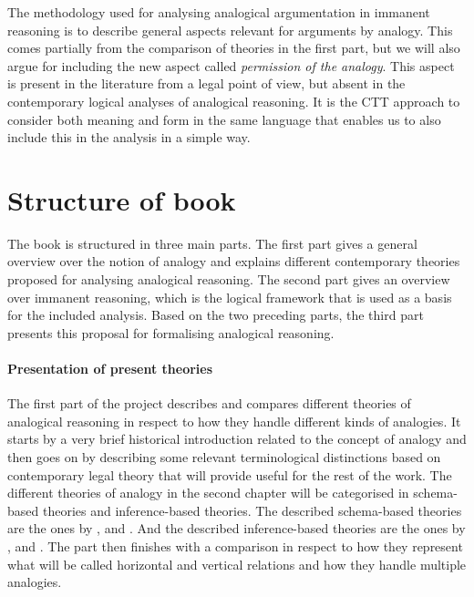     		The methodology used for analysing analogical argumentation in immanent reasoning is to describe general aspects relevant for arguments by analogy. This comes partially from the comparison of theories in the first part, but we will also argue for including the new aspect called \textit{permission of the analogy}. This aspect is present in the literature from a legal point of view, but absent in the contemporary logical analyses of analogical reasoning. It is the CTT approach to consider both meaning and form in the same language that enables us to also include this in the analysis in a simple way. 
    
    \section{Structure of book}
    
        The book is structured in three main parts. The first part gives a general overview over the notion of analogy and explains different contemporary theories proposed for analysing analogical reasoning. The second part gives an overview over immanent reasoning, which is the logical framework that is used as a basis for the included analysis. Based on the two preceding parts, the third part presents this proposal for formalising analogical reasoning. 
        
        \paragraph{Presentation of present theories}
        
            The first part of the project describes and compares different theories of analogical reasoning in respect to how they handle different kinds of analogies. It starts by a very brief historical introduction related to the concept of analogy and then goes on by describing some relevant terminological distinctions based on contemporary legal theory that will provide useful for the rest of the work. The different theories of analogy in the second chapter will be categorised in schema-based theories and inference-based theories. The described schema-based theories are the ones by \textcite{Brewer1996}, \textcite{alchourron1991argumentos} and \textcite{woods2015legal}. And the described inference-based theories are the ones by \textcite{Bartha2010}, \textcite{Prakken1996} and \textcite{Rahman2017}. The part then finishes with a comparison in respect to how they represent what will be called horizontal and vertical relations and how they handle multiple analogies.
            

